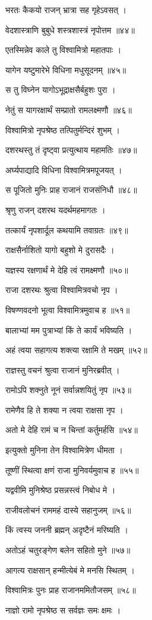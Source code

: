 भरतः कैकयो राजन् भ्रात्रा सह गृहेऽवसत् ।

वेदशास्त्राणि बुबुधे शस्त्रशास्त्रं नृपोत्तम ॥४४॥

एतस्मिन्नेव काले तु विश्वामित्रो महातपाः ।

यागेन यष्टुमारेभे विधिना मधुसूदनम् ॥४५॥

स तु विघ्नेन यागोऽभूद्राक्षसैर्बहुशः पुरा ।

नेतुं स यागरक्षार्थं सम्प्रातो रामलक्ष्मणौ ॥४६॥

विश्वामित्रो नृपश्रेष्ठ तत्पितुर्मन्दिरं शुभम् ।

दशरथस्तु तं दृष्ट्वा प्रत्युत्थाय महामतिः ॥४७॥

अर्घ्यपाद्यादि विधिना विश्वामित्रमपूजयत् ।

स पूजितो मुनिः प्राह राजानं राजसंनिधौ ॥४८॥

श्रृणु राजन् दशरथ यदर्थमहमागतः ।

तत्कार्यं नृपशार्दूल कथयामि तवाग्रतः ॥४९॥

राक्षसैर्नाशितो यागो बहुशो मे दुरासदैः ।

यज्ञस्य रक्षणार्थं मे देहि त्वं रामक्ष्मणौ ॥५०॥

राजा दशरथः श्रुत्वा विश्वामित्रवचो नृप ।

विषण्णवदनो भूत्वा विश्वामित्रमुवाच ह ॥५१॥

बालाभ्यां मम पुत्राभ्यां किं ते कार्यं भविष्यति ।

अहं त्वया सहागत्य शक्त्या रक्षामि ते मखम् ॥५२॥

राज्ञस्तु वचनं श्रुत्वा राजानं मुनिरब्रवीत् ।

रामोऽपि शक्नुते नूनं सर्वान्नशयितुं नृप ॥५३॥

रामेणैव हि ते शक्या न त्वया राक्षसा नृप ।

अतो मे देहि रामं च न चिन्तां कर्तुमर्हसि ॥५४॥

इत्युक्तो मुनिना तेन विश्वामित्रेण धीमता ।

तूष्णीं स्थित्वा क्षणं राजा मुनिवर्यमुवाच ह ॥५५॥

यद्ववीमि मुनिश्रेष्ठ प्रसन्नस्त्वं निबोध मे ।

राजीवलोचनं राममहं दास्ये सहानुजम् ॥५६॥

किं त्वस्य जननी ब्रह्मन् अदृष्टैनं मरिष्यति ।

अतोऽहं चतुरङ्गेण बलेन सहितो मुने ॥५७॥

आगत्य राक्षसान् हन्मीत्येबं मे मनसि स्थितम् ।

विश्वामित्रः पुनः प्राह राजानममितौजसम् ॥५८॥

नाज्ञो रामो नृपश्रेष्ठ स सर्वज्ञः समः क्षमः ।

